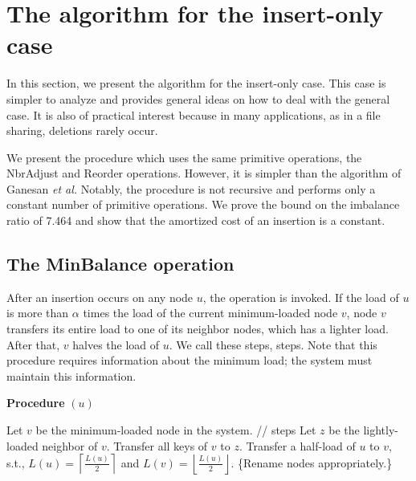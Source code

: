 \documentclass[a4paper]{article}
\begin{document}
\section{The algorithm for the insert-only case}
\label{sect:algorithm-insertonly}

In this section, we present the algorithm for the insert-only case.
This case is simpler to analyze and provides general ideas on how to
deal with the general case. It is also of practical interest because
in many applications, as in a file sharing, deletions rarely occur.

We present the {\minbalance} procedure which uses the same primitive
operations, the {\sc NbrAdjust} and {\sc Reorder} operations. However,
it is simpler than the algorithm {\adjload} of Ganesan {\em et al.}
Notably, the {\minbalance} procedure is not recursive and performs
only a constant number of primitive operations. We prove the bound on
the imbalance ratio of 7.464 and show that the
amortized cost of an insertion is a constant.

\subsection{The MinBalance operation}

After an insertion occurs on any node $u$, the {\minbalance}
operation is invoked. If the load of $u$ is more than $\alpha$ times
 the load of the current minimum-loaded node $v$, node $v$ transfers
its entire load to one of its neighbor nodes, which has a lighter load. 
After that, $v$ halves the load of $u$. We call these steps,  {\minbalance} steps.
Note that this procedure requires  information about the minimum
load; the system must maintain this information.

\begin{algorithm} {\bf Procedure} {\minbalance} $(u)$
  \begin{algorithmic}[1]
    \label{alg:minbalance}
    \STATE Let $v$ be the minimum-loaded node in the system.
    \STATE //{\minbalance} steps 
    \STATE Let $z$ be the lightly-loaded neighbor of $v$. 
    \STATE Transfer all keys of $v$ to $z$. 
    \STATE Transfer a half-load of $u$ to $v$,
    s.t., $L(u) = \left \lceil \frac{L(u)}{2}\right\rceil$ and $L(v) =
    \left\lfloor \frac{L(u)}{2} \right\rfloor$.  
    \STATE \{Rename nodes appropriately.\}
    \ENDIF
  \end{algorithmic}
\end{algorithm}
\end{document}
